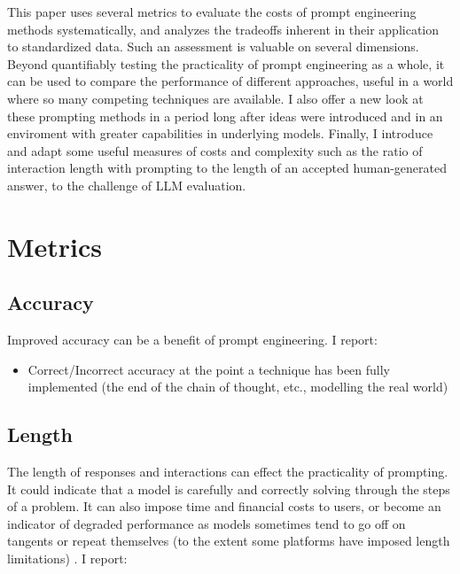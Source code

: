 \documentclass[11pt]{article}
\begin{document}
This paper uses several metrics to evaluate the costs of prompt engineering methods systematically, and analyzes the tradeoffs inherent in their application to standardized data. Such an assessment is valuable on several dimensions. Beyond quantifiably testing the practicality of prompt engineering as a whole, it can be used to compare the performance of different approaches, useful in a world where so many competing techniques are available. I also offer a new look at these prompting methods in a period long after ideas were introduced and in an enviroment with greater capabilities in underlying models. Finally, I introduce and adapt some useful measures of costs and complexity such as the ratio of interaction length with prompting to the length of an accepted human-generated answer, to the challenge of LLM evaluation.

\section*{Metrics}

\subsection*{Accuracy}

Improved accuracy can be a benefit of prompt engineering. I report:

\begin{itemize}
  \item Correct/Incorrect accuracy at the point a technique has been fully implemented (the end of the chain of thought, etc., modelling the real world)
\end{itemize}

\subsection*{Length}

The length of responses and interactions can effect the practicality of prompting. It could indicate that a model is carefully and correctly solving through the steps of a problem. It can also impose time and financial costs to users, or become an indicator of degraded performance as models sometimes tend to go off on tangents or repeat themselves (to the extent some platforms have imposed length limitations) \cite{mann_microsoft_nodate}. I report:
\end{document}
